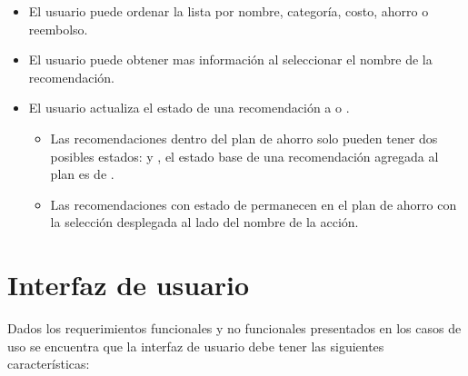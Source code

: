 \begin{usecase}
{\begin{itemize}
      \begin{itemize}
      \item El sistema debe indicar que la lista de recomendaciones es el plan
        de ahorro.
      \item El usuario puede agregar mas recomendaciones desde la lista de
        recomendaciones, cuando se añade una de estas solamente es
        visible en el plan de ahorro ya no debe de aparecer en la lista de
        recomendaciones
      \item El usuario puede remover recomendaciones de su plan seleccionando
         en un menú desplegable al lado del nombre de la
        acción.
      \end{itemize}
    \item El usuario puede ordenar la lista por nombre, categoría, costo, ahorro
      o reembolso.
    \item El usuario puede obtener mas información al seleccionar el nombre
      de la recomendación.
    \item El usuario actualiza el estado de una recomendación a
       o .
      \begin{itemize}
      \item Las recomendaciones dentro del plan de ahorro solo pueden tener
        dos posibles estados:  y ,
        el estado base de una recomendación agregada al plan es de
        .
      \item Las recomendaciones con estado de  permanecen
        en el plan de ahorro con la selección  desplegada
        al lado del nombre de la acción.
      \end{itemize}
    \end{itemize}
  }
\end{usecase}

\section{Interfaz de usuario}

Dados los requerimientos funcionales y no funcionales presentados en los
casos de uso se encuentra que la interfaz de usuario debe tener las
siguientes características:


